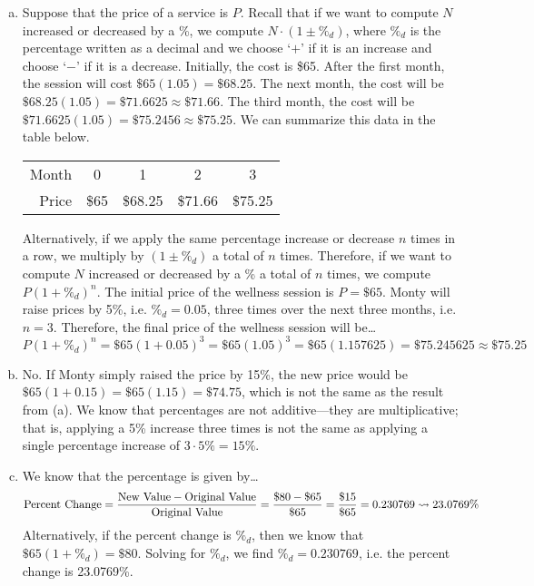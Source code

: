 \documentclass[11pt,letterpaper]{article}
\begin{document}
\sol 
\begin{enumerate}[(a)]
\item Suppose that the price of a service is $P$. Recall that if we want to compute $N$ increased or decreased by a \%, we compute $N \cdot (1 \pm \%_d)$, where $\%_d$ is the percentage written as a decimal and we choose `$+$' if it is an increase and choose `$-$' if it is a decrease. Initially, the cost is \$65. After the first month, the session will cost $\$65(1.05)= \$68.25$. The next month, the cost will be $\$68.25(1.05)= \$71.6625 \approx \$71.66$. The third month, the cost will be $\$71.6625(1.05)= \$75.2456 \approx \$75.25$. We can summarize this data in the table below. \par
	\begin{table}[H]
	\centering
	\begin{tabular}{r||cccc}
	Month & 0 & 1 & 2 & 3 \\  
	Price & \$65 & \$68.25 & \$71.66 & \$75.25
	\end{tabular}
	\end{table} \par
Alternatively, if we apply the same percentage increase or decrease $n$ times in a row, we multiply by $(1 \pm \%_d)$ a total of $n$ times. Therefore, if we want to compute $N$ increased or decreased by a \% a total of $n$ times, we compute $P(1 + \%_d)^n$. The initial price of the wellness session is $P= \$65$. Monty will raise prices by 5\%, i.e. $\%_d= 0.05$, three times over the next three months, i.e. $n= 3$. Therefore, the final price of the wellness session will be\dots
	\[
	P(1 + \%_d)^n= \$65(1 + 0.05)^3= \$65(1.05)^3= \$65(1.157625)= \$75.245625 \approx \$75.25 
	\] 

\item No. If Monty simply raised the price by 15\%, the new price would be $\$65(1 + 0.15)= \$65(1.15)= \$74.75$, which is not the same as the result from (a). We know that percentages are not additive---they are multiplicative; that is, applying a 5\% increase three times is not the same as applying a single percentage increase of $3 \cdot 5\%= 15\%$. 

\item We know that the percentage is given by\dots 
	\[
	\text{Percent Change}= \dfrac{\text{New Value} - \text{Original Value}}{\text{Original Value}}= \dfrac{\$80 - \$65}{\$65}= \dfrac{\$15}{\$65}= 0.230769 \rightsquigarrow 23.0769\%
	\]
Alternatively, if the percent change is $\%_d$, then we know that $\$65(1 + \%_d)= \$80$. Solving for $\%_d$, we find $\%_d= 0.230769$, i.e. the percent change is 23.0769\%. 


\end{enumerate}
\end{document}
